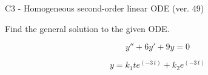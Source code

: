 \begin{exercise}
  \begin{exerciseTitle}C3 - Homogeneous second-order linear ODE (ver. 49)\end{exerciseTitle}
  \begin{exerciseStatement}
    
Find the general solution to the given ODE.

    
\[y''+6y'+9y = 0\]

  \end{exerciseStatement}
  \begin{exerciseAnswer}
    
\[y= k_{1} t e^{\left(-3 \, t\right)} + k_{2} e^{\left(-3 \, t\right)}\]

  \end{exerciseAnswer}
\end{exercise}